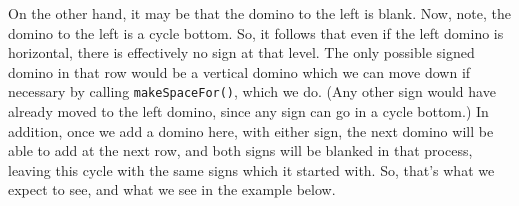\documentclass[12pt]{article}
\numberwithin{equation}{section}
\begin{document}
\begin{itemize}
\begin{itemize}
\begin{figure}[H]
      \end{figure}
      \begin{figure}[H]
        \centering
      \end{figure}

      On the other hand, it may be that the domino to the left is blank.
      Now, note, the domino to the left is a cycle bottom.
      So, it follows that even if the left domino is horizontal, there is effectively no sign at that level.
      The only possible signed domino in that row would be a vertical domino which we can move down if necessary by calling \texttt{makeSpaceFor()}, which we do.
      (Any other sign would have already moved to the left domino, since any sign can go in a cycle bottom.)
      In addition, once we add a domino here, with either sign, the next domino will be able to add at the next row, and both signs will be blanked in that process, leaving this cycle with the same signs which it started with.
      So, that's what we expect to see, and what we see in the example below.


\end{itemize}
\end{itemize}
\end{document}
